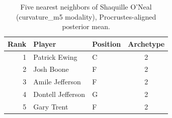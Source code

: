 \begin{table}[htbp]
  \centering\small
  \begin{tabular}{rllc}
    \toprule
    Rank & Player & Position & Archetype \\
    \midrule
    1 & Patrick Ewing & C & 2 \\
    2 & Josh Boone & F & 2 \\
    3 & Amile Jefferson & F & 2 \\
    4 & Dontell Jefferson & G & 2 \\
    5 & Gary Trent & F & 2 \\
    \bottomrule
  \end{tabular}
  \caption{Five nearest neighbors of Shaquille O'Neal (curvature_m5 modality), Procrustes-aligned posterior mean.}
  \label{tab:Shaquille_O_Neal_neighbors_curvature_m5}
\end{table}

